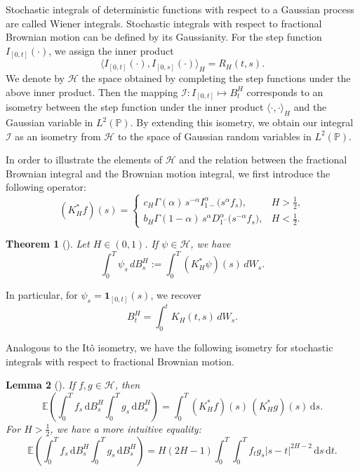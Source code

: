 \documentclass{article}
\newtheorem{theorem}{Theorem}[section]
\newtheorem{lemma}[theorem]{Lemma}
\theoremstyle{definition}  %
\theoremstyle{plain}  %
\begin{document}
Stochastic integrals of deterministic functions with respect to a Gaussian process are called Wiener integrals.  Stochastic integrals with respect to fractional Brownian motion can be defined by  its Gaussianity. For the step function $I_{[0,t]}(\cdot)$, we assign the inner product 
\[
\langle I_{[0,t]}(\cdot), I_{[0,s]}(\cdot) \rangle_H = R_H(t,s).
\]
We denote by $\mathcal{H}$ the space obtained by completing the step functions under the above inner product.
Then the mapping $\mathcal{I}:I_{[0,t]}\longmapsto B^H_t$ corresponds to an isometry between the step function under the inner product $\langle  \cdot, \cdot \rangle_H $ and the Gaussian variable in $L^2(\mathbb{P})$. By extending this isometry, we obtain our integral $\mathcal{I}$ as an isometry from $\mathcal{H}$ to the space of Gaussian random variables in $L^2(\mathbb{P})$.


In order to illustrate the elements of $\mathcal{H}$ and the relation between the fractional Brownian  integral and the Brownian motion integral, we first introduce the following operator:
\[
  (K_H^*f)(s)=
  \begin{cases}
    c_H\Gamma(\alpha)\, s^{-\alpha}I_{1-}^\alpha\big(s^\alpha f_s\big), & H>\tfrac{1}{2}, \\[1ex]
    b_H\Gamma(1-\alpha)\, s^\alpha D^\alpha_{1^-}\big(s^{-\alpha}f_s\big), & H<\tfrac{1}{2}.
  \end{cases}
\]

\begin{theorem}[\cite{Biagini2008}]
Let $H\in(0,1)$. 
If $\psi\in\mathcal{H}$, we have
\begin{equation*}
  \int_0^T \psi_s\,dB^H_s 
  := \int_0^T (K_H^*\psi)(s)\,dW_s.
\end{equation*}
\end{theorem}
In particular, for $\psi_s=\mathbf{1}_{[0,t]}(s)$, we recover
\begin{equation*}
  B^H_t=\int_0^t K_H(t,s)\,dW_s.
\end{equation*}


Analogous to the It\^o isometry, we have the following isometry for stochastic integrals with respect to fractional Brownian motion.
\begin{lemma}[\cite{Biagini2008}]\label{isometry}
If $f,g\in\mathcal{H}$, then
\begin{equation*}
  \mathbb{E}\!\left(\int_0^T f_s\,\mathrm{d}B^H_s \int_0^T g_s\,\mathrm{d}B^H_s\right)
  =\int_0^T (K_H^*f)(s)\,(K_H^*g)(s)\,\mathrm{d}s.
\end{equation*}
For $H > \tfrac{1}{2}$, we have a more intuitive equality:
\begin{equation}
    \mathbb{E}\!\left(\int_0^T f_s\,\mathrm{d}B^H_s \int_0^T g_s\,\mathrm{d}B^H_s\right)
    =H(2H-1)\int_0^T\int_0^T f_t g_s |s-t|^{2H-2}\,\mathrm{d}s\,\mathrm{d}t.
\end{equation}
\end{lemma}
\end{document}
